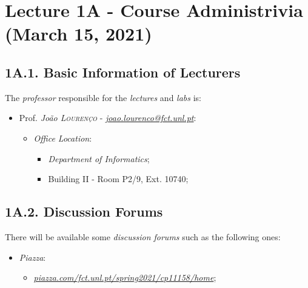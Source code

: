 \section*{\Large{\textbf{Lecture 1A - Course Administrivia}} \small{(March 15, 2021)}}
\label{sec:lecture-1A}

\subsection*{\large{\textbf{1A.1. Basic Information of Lecturers}}}
\label{ssec:lecture-1A1}

\noindent The \emph{professor} responsible for the \emph{lectures} and \emph{labs} is:

\begin{itemize}
    \vspace{-0.2cm}
    \item Prof. \emph{João \textsc{Lourenço}} - \href{mailto:joao.lourenco@fct.unl.pt}{\emph{joao.lourenco@fct.unl.pt}}:
    \begin{itemize}
        \vspace{-0.2cm}
        \item \emph{Office Location}:
        \begin{itemize}
            \vspace{-0.1cm}
            \item \emph{Department of Informatics};
            \item Building II - Room P2/9, Ext. 10740;
        \end{itemize}
    \end{itemize}
\end{itemize}

\subsection*{\large{\textbf{1A.2. Discussion Forums}}}
\label{ssec:lecture-1A2}

\noindent There will be available some \emph{discussion forums} such as the following ones:
\begin{itemize}
    \vspace{-0.2cm}
    \item \emph{Piazza}:
    \begin{itemize}
        \vspace{-0.2cm}
        \item \href{piazza.com/fct.unl.pt/spring2021/cp11158/home}{\emph{piazza.com/fct.unl.pt/spring2021/cp11158/home}};
    \end{itemize}
\end{itemize}


